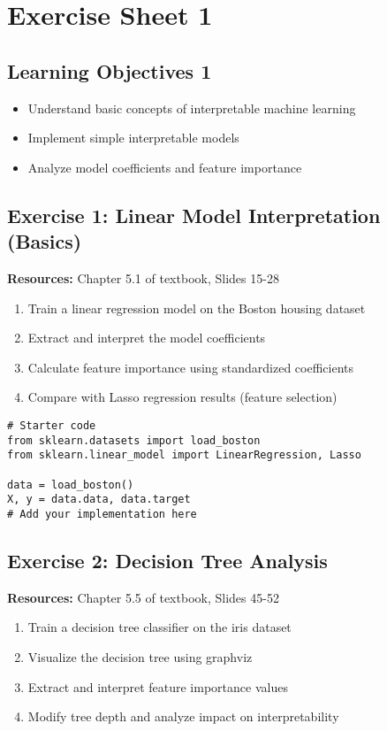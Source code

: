 \chapter*{Exercise Sheet 1}
\section*{Learning Objectives 1}
\begin{itemize}
\item Understand basic concepts of interpretable machine learning
\item Implement simple interpretable models
\item Analyze model coefficients and feature importance
\end{itemize}

\section*{Exercise 1: Linear Model Interpretation (Basics)}
\textbf{Resources:} Chapter 5.1 of textbook, Slides 15-28

\begin{enumerate}
\item Train a linear regression model on the Boston housing dataset
\item Extract and interpret the model coefficients
\item Calculate feature importance using standardized coefficients
\item Compare with Lasso regression results (feature selection)
\end{enumerate}

\begin{verbatim}
# Starter code
from sklearn.datasets import load_boston
from sklearn.linear_model import LinearRegression, Lasso

data = load_boston()
X, y = data.data, data.target
# Add your implementation here
\end{verbatim}

\section*{Exercise 2: Decision Tree Analysis}
\textbf{Resources:} Chapter 5.5 of textbook, Slides 45-52

\begin{enumerate}
\item Train a decision tree classifier on the iris dataset
\item Visualize the decision tree using graphviz
\item Extract and interpret feature importance values
\item Modify tree depth and analyze impact on interpretability
\end{enumerate}

